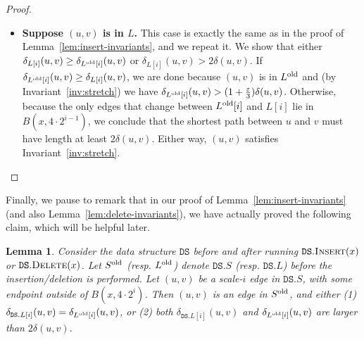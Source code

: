 \documentclass[11pt]{article}
\let\e\varepsilon               %
\def\aftermath{\par\vspace{-\belowdisplayskip}\vspace{-\baselineskip}}
\newtheorem{lemma}[theorem]{Lemma}
\newcommand{\cN}{\mathcal{N}}
\newcommand{\dist}{\ensuremath{\delta}}
\newcommand{\DS}{\texttt{DS}}
\newcommand{\sparse}{{\ensuremath{\DS.S}}}
\newcommand{\net}{{\ensuremath{\DS.\cN}}}
\newcommand{\light}{{\ensuremath{\DS.L}}}
\begin{document}
\begin{proof}
\begin{itemize}
%
        It remains to show that if $(u,v) \in S \setminus S^{\rm old}$ then $u,v \in B(x, 4 \cdot 2^i)$. Because $(u,v)$ is a scale-$i$ edge of $S$, the endpoints $u$ and $v$ belong to $\e 2^i$-net of the net-tree $\net$. In other words, letting $i' \coloneqq \log(\e 2^i)$, both $u$ and $v$ belong to the net $N_{i'}$. Moreover, because $(u,v)$ is not in $S^{\rm old}$, one endpoint (WLOG $u$) is $N_{i'}^{\rm old}$ but not $N_{i'}$. By Lemma~\ref{lem:net-delete-local}, we have $\dist(u,x) \le 2^{i'}$. By triangle inequality, $\dist(v,x) \le 2^{i'} + 2^i < 2 \cdot 2^i$. We conclude that $u,v \in B(x, 4 \cdot 2^i)$ as desired.
        \item \textbf{\boldmath Suppose $(u,v)$ is in $L$.} This case is exactly the same as in the proof of Lemma~\ref{lem:insert-invariants}, and we repeat it. We show that either $\dist_{L[i]}(u,v) \ge \dist_{L^{\rm old}[i]}(u,v)$ or $\dist_{L[i]}(u,v) > 2 \dist(u,v)$.
        If $\dist_{L^{\rm old}[i]}(u,v) \ge \dist_{L[i]}(u,v)$, we are done because $(u,v)$ is in $L^{\rm old}$ and (by Invariant~\ref{inv:stretch}) we have $\dist_{L^{\rm old}[i]}(u,v) > (1+ \frac \e 3) \dist(u,v)$. Otherwise, because the only edges that change between $L^{\rm old}[i]$ and $L[i]$ lie in $B(x,4 \cdot 2^{i-1})$, we conclude that the shortest path between $u$ and $v$ must have length at least $2 \dist(u,v)$. Either way, $(u,v)$ satisfies Invariant~\ref{inv:stretch}.
    \aftermath
        \end{itemize}
\end{proof}
%
% 
%
Finally, we pause to remark that in our proof of Lemma~\ref{lem:insert-invariants} (and also Lemma~\ref{lem:delete-invariants}), we have actually proved the following claim, which will be helpful later.
\begin{lemma}
\label{lem:dist-unchanged}
Consider the data structure $\DS$ before and after running $\DS.\textsc{Insert}(x)$ or $\DS.\textsc{Delete}(x)$. Let $S^{\rm old}$ (resp. $L^{\rm old}$) denote $\sparse$ (resp. $\light$) before the insertion/deletion is performed.
Let $(u,v)$ be a scale-$i$ edge in $\sparse$, with some endpoint outside of $B(x, 4\cdot 2^i)$. Then $(u,v)$ is an edge in $S^{\rm old}$, and either (1)
$\dist_{\light[i]}(u,v) = \dist_{L^{\rm old}[i]}(u,v)$, or (2) both $\dist_{\light[i]}(u,v)$ and $\dist_{L^{\rm old}[i]}(u,v)$ are larger than $2 \dist(u,v)$.
\end{lemma}
%
%
\end{document}
